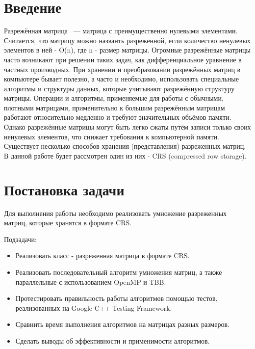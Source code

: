 \documentclass{report}
\begin{document}
\setcounter{page}{2}
\tableofcontents
\newpage

\section* {Введение}
Разрежённая матрица ~--- матрица с преимущественно нулевыми элементами. Считается, что матрицу можно названть разреженной, если количество ненулевых элементов в ней - O(n), где n - размер матрицы.
\newline
Огромные разрежённые матрицы часто возникают при решении таких задач, как дифференциальное уравнение в частных производных. При хранении и преобразовании разрежённых матриц в компьютере бывает полезно, а часто и необходимо, использовать специальные алгоритмы и структуры данных, которые учитывают разрежённую структуру матрицы. Операции и алгоритмы, применяемые для работы с обычными, плотными матрицами, применительно к большим разрежённым матрицам работают относительно медленно и требуют значительных объёмов памяти. Однако разрежённые матрицы могут быть легко сжаты путём записи только своих ненулевых элементов, что снижает требования к компьютерной памяти.
\newline
Существует несколько способов хранения (представления) разреженных матриц. В данной работе будет рассмотрен один из них - CRS (compressed row storage).

\newpage

\section* {Постановка задачи}
Для выполнения работы необходимо реализовать умножение разреженных матриц, которые хранятся в формате CRS.
\par Подзадачи:
\begin{itemize}
    \item Реализовать класс - разреженная матрица в формате CRS.
    \item Реализовать последовательный алгоритм умножения матриц, а также параллельные с использованием OpenMP и TBB.
    \item Протестировать правильность работы алгоритмов помощью тестов, реализованных на Google C++ Testing Framework. 
    \item Сравнить время выполнения алгоритмов на матрицах разных размеров.
    \item Сделать выводы об эффективности и применимости алгоритмов.
\end{itemize}
\end{document}

